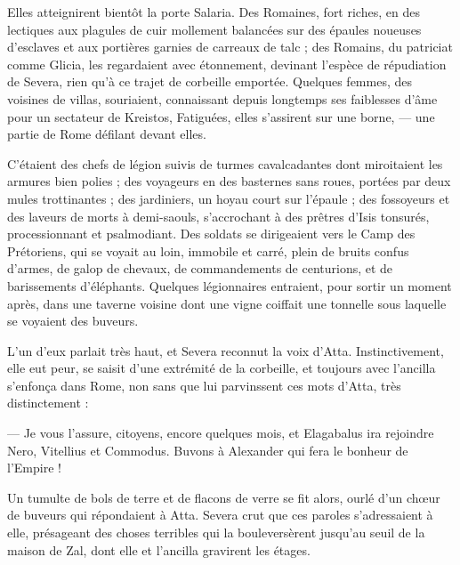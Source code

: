 \documentclass[a4paper, 11pt, oneside, polutonikogreek, french]{article}
\begin{document}
Elles atteignirent bientôt la porte Salaria. Des Romaines, fort riches, en des lectiques aux plagules de cuir mollement balancées sur des épaules noueuses d'esclaves et aux portières garnies de carreaux de talc ; des Romains, du patriciat comme Glicia, les regardaient avec étonnement, devinant l'espèce de répudiation de Severa, rien qu'à ce trajet de corbeille emportée. Quelques femmes, des voisines de villas, souriaient, connaissant depuis longtemps ses faiblesses d'âme pour un sectateur de Kreistos, Fatiguées, elles s'assirent sur une borne, --- une partie de Rome défilant devant elles.

C'étaient des chefs de légion suivis de turmes cavalcadantes dont miroitaient les armures bien polies ; des voyageurs en des basternes sans roues, portées par deux mules trottinantes ; des jardiniers, un hoyau court sur l'épaule ; des fossoyeurs et des laveurs de morts à demi-saouls, s'accrochant à des prêtres d'Isis tonsurés, processionnant et psalmodiant. Des soldats se dirigeaient vers le Camp des Prétoriens, qui se voyait au loin, immobile et carré, plein de bruits confus d'armes, de galop de chevaux, de commandements de centurions, et de barissements d'éléphants. Quelques légionnaires entraient, pour sortir un moment après, dans une taverne voisine dont une vigne coiffait une tonnelle sous laquelle se voyaient des buveurs.

L'un d'eux parlait très haut, et Severa reconnut la voix d'Atta. Instinctivement, elle eut peur, se saisit d'une extrémité de la corbeille, et toujours avec l'ancilla s'enfonça dans Rome, non sans que lui parvinssent ces mots d'Atta, très distinctement :

--- Je vous l'assure, citoyens, encore quelques mois, et Elagabalus ira rejoindre Nero, Vitellius et Commodus. Buvons à Alexander qui fera le bonheur de l'Empire !

Un tumulte de bols de terre et de flacons de verre se fit alors, ourlé d'un chœur de buveurs qui répondaient à Atta. Severa crut que ces paroles s'adressaient à elle, présageant des choses terribles qui la bouleversèrent jusqu'au seuil de la maison de Zal, dont elle et l'ancilla gravirent les étages.
\end{document}
